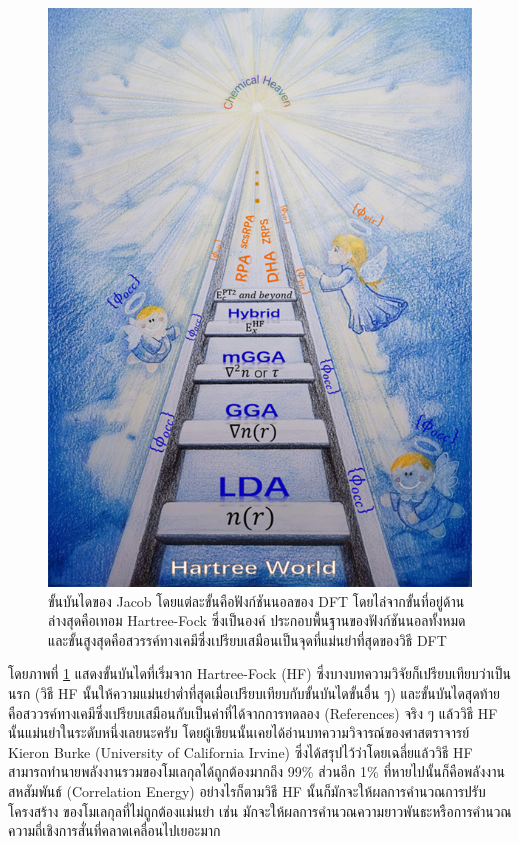 \begin{figure}[htbp]
    \centering
    \includegraphics[width=0.9\linewidth]{fig/jacob_ladder.jpg}
    \caption{ขั้นบันไดของ Jacob โดยแต่ละขั้นคือฟังก์ชันนอลของ DFT โดยไล่จากขั้นที่อยู่ด้านล่างสุดคือเทอม Hartree-Fock ซึ่งเป็นองค์%
    ประกอบพื้นฐานของฟังก์ชันนอลทั้งหมดและขั้นสูงสุดคือสวรรค์ทางเคมีซึ่งเปรียบเสมือนเป็นจุดที่แม่นยำที่สุดของวิธี DFT}
    \label{fig:jacob_ladder}
\end{figure}

โดยภาพที่ \ref{fig:jacob_ladder} แสดงขั้นบันไดที่เริ่มจาก Hartree-Fock (HF) ซึ่งบางบทความวิจัยก็เปรียบเทียบว่าเป็นนรก (วิธี HF 
นั้นให้ความแม่นยำต่ำที่สุดเมื่อเปรียบเทียบกับขั้นบันไดขั้นอื่น ๆ) และขั้นบันไดสุดท้ายคือสววรค์ทางเคมีซึ่งเปรียบเสมือนกับเป็นค่าที่ได้จากการทดลอง 
(References) จริง ๆ แล้ววิธี HF นั้นแม่นยำในระดับหนึ่งเลยนะครับ โดยผู้เขียนนั้นเคยได้อ่านบทความวิจารณ์ของศาสตราจารย์ Kieron Burke 
(University of California Irvine) ซึ่งได้สรุปไว้ว่าโดยเฉลี่ยแล้ววิธี HF สามารถทำนายพลังงานรวมของโมเลกุลได้ถูกต้องมากถึง 99\% 
ส่วนอีก 1\% ที่หายไปนั้นก็คือพลังงานสหสัมพันธ์ (Correlation Energy) อย่างไรก็ตามวิธี HF นั้นก็มักจะให้ผลการคำนวณการปรับโครงสร้าง%
ของโมเลกุลที่ไม่ถูกต้องแม่นยำ เช่น มักจะให้ผลการคำนวณความยาวพันธะหรือการคำนวณความถี่เชิงการสั่นที่คลาดเคลื่อนไปเยอะมาก 

